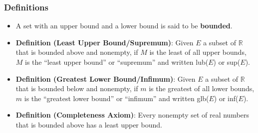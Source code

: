 \documentclass{article}
\theoremstyle{break}
\begin{document}
\subsubsection{Definitions}

\begin{itemize}
\item A set with an upper bound and a lower bound is said to be
  \textbf{bounded}.

\item \textbf{Definition (Least Upper Bound/Supremum)}: Given $E$ a subset of
$\mathbb{R}$ that is bounded above and nonempty, if $M$ is the least of all
upper bounds, $M$ is the ``least upper bound'' or ``supremum'' and written
lub($E$) or sup($E$).

\item \textbf{Definition (Greatest Lower Bound/Infimum)}: Given $E$ a subset of
$\mathbb{R}$ that is bounded below and nonempty, if $m$ is the greatest of all
lower bounds, $m$ is the ``greatest lower bound'' or ``infimum'' and written
glb($E$) or inf($E$).

\item \textbf{Definition (Completeness Axiom)}: Every nonempty set of real
  numbers that is bounded above has a least upper bound.
\end{itemize}
\end{document}
